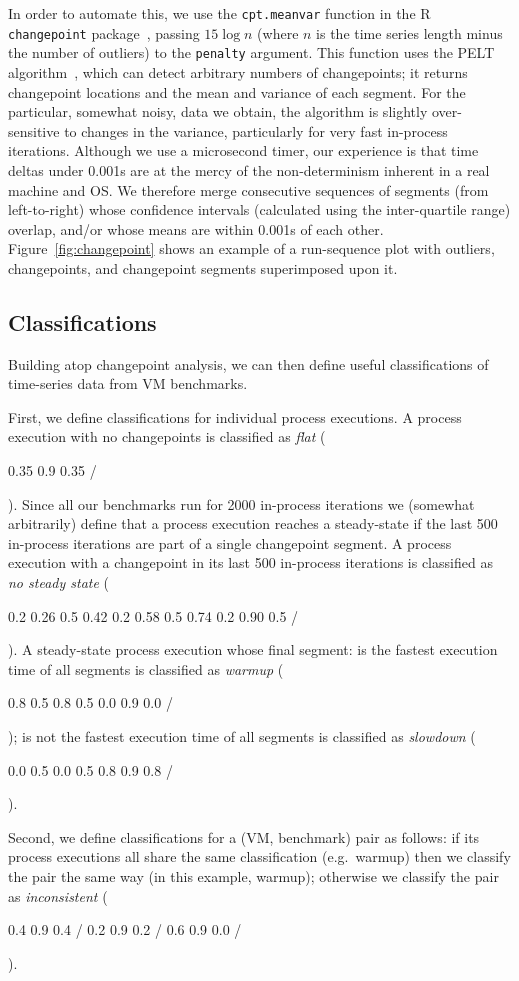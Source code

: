 \documentclass[preprint,numbers,10pt]{sigplanconf}
\DeclareRobustCommand{\flatc}{%
\setlength{\sparklinethickness}{0.4pt}%
\begin{sparkline}{1.5}
\spark 0.1 0.35
       0.9 0.35
       /%
\end{sparkline}\xspace}
\DeclareRobustCommand{\nosteadystate}{%
\setlength{\sparklinethickness}{0.4pt}%
\begin{sparkline}{1.5}
\spark 0.1 0.2
       0.26 0.5
       0.42 0.2
       0.58 0.5
       0.74 0.2
       0.90 0.5
       /%
\end{sparkline}\xspace}
\DeclareRobustCommand{\warmup}{%
\setlength{\sparklinethickness}{0.4pt}%
\begin{sparkline}{1.5}
\spark 0.1 0.8
       0.5 0.8
       0.5 0.0
       0.9 0.0
       /%
\end{sparkline}\xspace}
\DeclareRobustCommand{\slowdown}{%
\setlength{\sparklinethickness}{0.4pt}%
\begin{sparkline}{1.5}
\spark 0.1 0.0
       0.5 0.0
       0.5 0.8
       0.9 0.8
       /%
\end{sparkline}\xspace}
\DeclareRobustCommand{\inconsistent}{%
\setlength{\sparklinethickness}{0.4pt}%
\begin{sparkline}{1.5}
\spark 0.1 0.4
       0.9 0.4
       /%
\spark 0.1 0.2
       0.9 0.2
       /%
\spark 0.1 0.6
       0.9 0.0
       /%
\end{sparkline}\xspace}
\begin{document}
In order to automate this, we use the \texttt{cpt.meanvar} function in the R
\texttt{changepoint} package~\cite{R:changepoint}, passing $15\log{n}$ (where
$n$ is the time series length minus the number of outliers) to the
\texttt{penalty} argument. This function uses the PELT
algorithm~\citep{Killick2012}, which can detect arbitrary numbers of changepoints; it
returns changepoint locations and the mean and variance
of each segment. For the particular, somewhat noisy, data we obtain, the
algorithm is slightly over-sensitive to changes in the variance, particularly
for very fast in-process iterations. Although we use a microsecond timer, our experience
is that time deltas under 0.001s are at the mercy of the non-determinism
inherent in a real machine and OS. We therefore merge consecutive sequences of segments (from
left-to-right) whose confidence intervals (calculated using the inter-quartile
range) overlap, and/or whose means are within 0.001s of each other.
Figure~\ref{fig:changepoint} shows an example of a run-sequence plot with
outliers, changepoints, and changepoint segments superimposed upon it.


\subsection{Classifications}

Building atop changepoint analysis, we can then define useful classifications of
time-series data from VM benchmarks.

First, we define classifications for individual process executions. A process
execution with no changepoints is classified as
\emph{flat} (\flatc). Since all our benchmarks run for 2000 in-process
iterations we (somewhat arbitrarily) define that a process execution reaches a
steady-state if the last 500 in-process iterations are part of a single
changepoint segment. A process execution with a changepoint in its last
500 in-process iterations is classified as \emph{no steady state}
(\nosteadystate). A steady-state process execution whose final segment:
is the fastest execution time of all segments is classified as \emph{warmup}
(\warmup); is not the fastest execution time of all segments is classified as
\emph{slowdown} (\slowdown).

Second, we define classifications for a (VM, benchmark) pair as follows:
if its process executions all share the same classification (e.g.~warmup) then
we classify the pair the same way (in this example, warmup); otherwise we classify the pair as
\emph{inconsistent} (\inconsistent).
\end{document}
